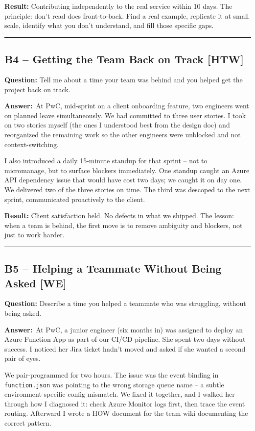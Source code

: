 \documentclass[letterpaper,10pt]{article}
\newlength{\boxwidth}
\newcommand{\bquestionbox}[1]{%
  \vspace{6pt}%
  \noindent\colorbox{bqbg}{%
    \begin{minipage}{\boxwidth}%
      \vspace{3pt}\textbf{\textcolor{orange!70!black}{Question:}} #1\vspace{3pt}%
    \end{minipage}%
  }\vspace{2pt}%
}
\newcommand{\answerlabel}{\noindent\textbf{\textcolor{answerblue}{Answer:}}~}
\begin{document}
\textbf{Result:} Contributing independently to the real service within 10 days. The principle: don't read docs front-to-back. Find a real example, replicate it at small scale, identify what you don't understand, and fill those specific gaps.

\rule{\linewidth}{0.2pt}

\subsection*{B4 -- Getting the Team Back on Track \textmd{[HTW]}}

\bquestionbox{Tell me about a time your team was behind and you helped get the project back on track.}

\answerlabel At PwC, mid-sprint on a client onboarding feature, two engineers went on planned leave simultaneously. We had committed to three user stories. I took on two stories myself (the ones I understood best from the design doc) and reorganized the remaining work so the other engineers were unblocked and not context-switching.

I also introduced a daily 15-minute standup for that sprint -- not to micromanage, but to surface blockers immediately. One standup caught an Azure API dependency issue that would have cost two days; we caught it on day one. We delivered two of the three stories on time. The third was descoped to the next sprint, communicated proactively to the client.

\textbf{Result:} Client satisfaction held. No defects in what we shipped. The lesson: when a team is behind, the first move is to remove ambiguity and blockers, not just to work harder.

\rule{\linewidth}{0.2pt}

\subsection*{B5 -- Helping a Teammate Without Being Asked \textmd{[WE]}}

\bquestionbox{Describe a time you helped a teammate who was struggling, without being asked.}

\answerlabel At PwC, a junior engineer (six months in) was assigned to deploy an Azure Function App as part of our CI/CD pipeline. She spent two days without success. I noticed her Jira ticket hadn't moved and asked if she wanted a second pair of eyes.

We pair-programmed for two hours. The issue was the event binding in \texttt{function.json} was pointing to the wrong storage queue name -- a subtle environment-specific config mismatch. We fixed it together, and I walked her through how I diagnosed it: check Azure Monitor logs first, then trace the event routing. Afterward I wrote a HOW document for the team wiki documenting the correct pattern.
\end{document}
